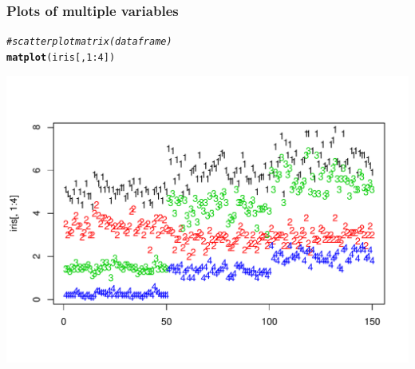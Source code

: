 \documentclass[12pt]{beamer}\usepackage[]{graphicx}\usepackage[]{color}
\makeatletter
\newcommand{\hlnum}[1]{\textcolor[rgb]{0.686,0.059,0.569}{#1}}%
\newcommand{\hlcom}[1]{\textcolor[rgb]{0.678,0.584,0.686}{\textit{#1}}}%
\newcommand{\hlopt}[1]{\textcolor[rgb]{0,0,0}{#1}}%
\newcommand{\hlstd}[1]{\textcolor[rgb]{0.345,0.345,0.345}{#1}}%
\newcommand{\hlkwd}[1]{\textcolor[rgb]{0.737,0.353,0.396}{\textbf{#1}}}%
\newenvironment{kframe}{%
 \def\at@end@of@kframe{}%
 \ifinner\ifhmode%
  \def\at@end@of@kframe{\end{minipage}}%
  \begin{minipage}{\columnwidth}%
 \fi\fi%
 \def\FrameCommand##1{\hskip\@totalleftmargin \hskip-\fboxsep
 \colorbox{shadecolor}{##1}\hskip-\fboxsep
     \hskip-\linewidth \hskip-\@totalleftmargin \hskip\columnwidth}%
 \MakeFramed {\advance\hsize-\width
   \@totalleftmargin\z@ \linewidth\hsize
   \@setminipage}}%
 {\par\unskip\endMakeFramed%
 \at@end@of@kframe}
\newenvironment{knitrout}{}{} %
\makeatother
\begin{document}
\begin{frame}[fragile]
\frametitle{Plots of multiple variables}
\begin{knitrout}\footnotesize
{}\color{fgcolor}\begin{kframe}
\begin{alltt}
\hlcom{# scatter plot matrix (data frame)}
\hlkwd{matplot}\hlstd{(iris[ ,} \hlnum{1}\hlopt{:}\hlnum{4}\hlstd{])}
\end{alltt}
\end{kframe}

{\centering \includegraphics[width=.8\linewidth,height=.65\linewidth]{figure/unnamed-chunk-23-1} 

}



\end{knitrout}
\end{frame}

\end{document}
